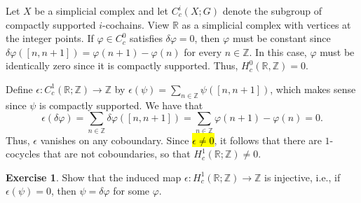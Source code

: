 \documentclass[10pt,letterpaper,cm]{nupset}
\theoremstyle{definition}
\theoremstyle{theorem}
\newtheorem{exercise}[definition]{Exercise}
\theoremstyle{remark}
\newcommand{\R}{\mathbb{R}}
\newcommand{\Z}{\mathbb Z}
\newcommand{\1}{\mathbb{1}}
\newcommand{\0}{\vec 0}
\begin{document}
Let  $X$ be a simplicial complex and let $C^i_c(X;G)$ denote the subgroup of compactly supported $i$-cochains. View $\R$ as a simplicial complex with vertices at the integer points. If $\varphi \in C^0_c$ satisfies $\delta{\varphi} =0$, then $\varphi$ must be constant since $\delta{\varphi}([n, n+1]) = \varphi(n+1) - \varphi(n)$ for every $n\in \Z$. In this case, $\varphi$ must be identically zero since it is compactly supported. Thus, $H^0_c(\R, \Z) =0$.

Define $\epsilon : C_c^1(\R; \Z) \to \Z$ by $ \epsilon(\psi) = \sum_{n\in \Z}\psi([n , n+1])$, which makes sense since $\psi$ is compactly supported. We have that $$\epsilon(\delta{\varphi}) = \sum_{n\in \Z} \delta{\varphi}([n, n+1]) = \sum_{n\in \Z} \varphi(n+1) - \varphi(n) =0.$$ Thus, $\epsilon$ vanishes on any coboundary. Since \hl{$\epsilon \ne 0$}, it follows that there are $1$-cocycles that are not coboundaries, so that $H_c^1(\R; \Z) \ne 0$. 

\begin{exercise}
Show that the induced map $\epsilon: H_c^1(\R; \Z) \to \Z$ is injective, i.e., if $\epsilon(\psi) =0$, then $\psi= \delta{\varphi}$ for some $\varphi$.
\end{exercise}
\end{document}
